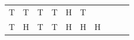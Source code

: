 {\begin{tabular}[t]{|l|l|l|l|l|l|l|l|l|l|}
        T &
        T &
        T &
        T &
        H &
        T%
     \tabularnewline\cline{1-1}\cline{2-2}\cline{3-3}\cline{4-4}\cline{5-5}\cline{6-6}\cline{7-7}\cline{8-8}\cline{9-9}\cline{10-10}
        T &
        H &
        T &
        T &
        H &
        H &
        H &

\end{tabular}}
